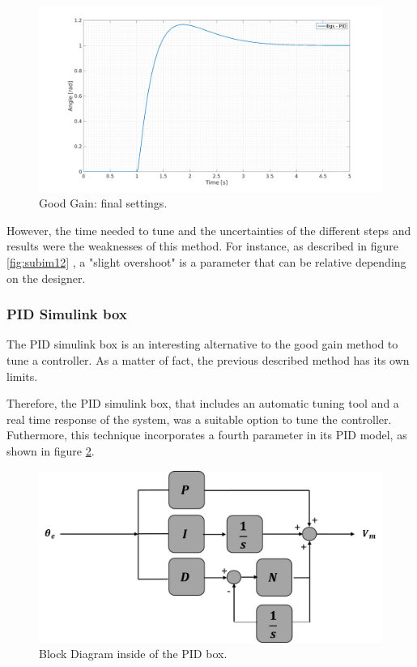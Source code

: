 \begin{figure}[H]
  \centerline{
  \includegraphics[scale=0.35]{figures/GG5.png}}
  \caption[LABEL] {Good Gain: final settings.}
  \label{finalGG}
\end{figure}

However, the time needed to tune and the uncertainties of the different steps and results were the weaknesses of this method. For instance, as described in figure \ref{fig:subim12} , a "slight overshoot" is a parameter that can be relative depending on the designer.\par  
  
\subsubsection{PID Simulink box}
The PID simulink box is an interesting alternative to the good gain method to tune a controller. As a matter of fact, the previous described method has its own limits.\par 
  
Therefore, the PID simulink box, that includes an automatic tuning tool and a real time response of the system, was a suitable option to tune the controller. Futhermore, this technique incorporates a fourth parameter in its PID model, as shown in figure \ref{PID_box_N}. 
 
\begin{figure}[H]
\centering
\includegraphics[scale=0.6]{figures/controller_box.png}
\caption{Block Diagram inside of the PID box.}
\label{PID_box_N}
\end{figure}

